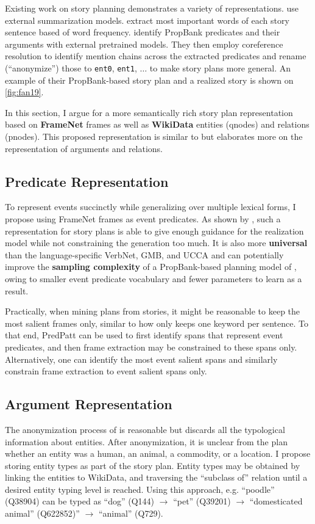 \documentclass[11pt,a4paper]{article}
\begin{document}
Existing work on story planning demonstrates a variety of representations.  use external summarization models.   extract most important words of each story sentence based of word frequency.  identify PropBank predicates and their arguments with external pretrained models. They then employ coreference resolution to identify mention chains across the extracted predicates and rename (``anonymize'') those to \texttt{ent0}, \texttt{ent1}, $\ldots$ to make story plans more general. An example of their PropBank-based story plan and a realized story is shown on \autoref{fig:fan19}.

In this section, I argue for a more semantically rich story plan representation based on \textbf{FrameNet} frames as well as \textbf{WikiData} entities (qnodes) and relations (pnodes). This proposed representation is similar to  but elaborates more on the representation of arguments and relations.

\subsection{Predicate Representation}
To represent events succinctly while generalizing over multiple lexical forms, I propose using FrameNet frames as event predicates. As shown by  \cite{ou2021infillmore}, such a representation for story plans is able to give enough guidance for the realization model while not constraining the generation too much. It is also more \textbf{universal} than the language-specific VerbNet, GMB, and UCCA and can potentially improve the \textbf{sampling complexity} of a PropBank-based planning model of , owing to smaller event predicate vocabulary and fewer parameters to learn as a result.

Practically, when mining plans from stories, it might be reasonable to keep the most salient frames only, similar to how  only keeps one keyword per sentence. To that end, PredPatt can be used to first identify spans that represent event predicates, and then frame extraction may be constrained to these spans only. Alternatively, one can identify the most event salient spans \cite{liu2018automatic} and similarly constrain frame extraction to event salient spans only.

\subsection{Argument Representation}
The anonymization process of  is reasonable but discards all the typological information about entities. After anonymization, it is unclear from the plan whether an entity was a human, an animal, a commodity, or a location. I propose storing entity types as part of the story plan. Entity types may be obtained by linking the entities to WikiData, and traversing the ``subclass of'' relation until a desired entity typing level is reached. Using this approach, e.g. ``poodle'' (Q38904) can be typed as ``dog'' (Q144) $\rightarrow$ ``pet'' (Q39201) $\rightarrow$ ``domesticated animal'' (Q622852)'' $\rightarrow$ ``animal'' (Q729).
\end{document}
